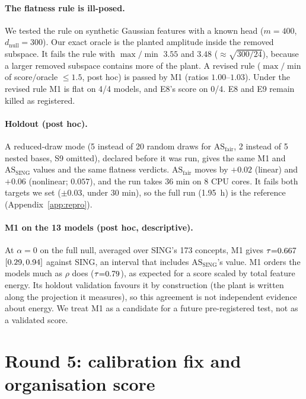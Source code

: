 \documentclass[10pt]{article}
\newcommand{\ASS}{\mathrm{AS}_{\mathrm{SING}}}
\newcommand{\ASF}{\mathrm{AS}_{\mathrm{fair}}}
\begin{document}
\paragraph{The flatness rule is ill-posed.}
We tested the rule on synthetic Gaussian features with a known head ($m{=}400$, $d_{\mathrm{null}}{=}300$). Our exact oracle is the planted amplitude inside the removed subspace. It fails the rule with $\max/\min$ $3.55$ and $3.48$ ($\approx\sqrt{300/24}$), because a larger removed subspace contains more of the plant.
A revised rule ($\max/\min$ of score$/$oracle $\le1.5$, post hoc) is passed by M1 (ratios $1.00$--$1.03$).
Under the revised rule M1 is flat on 4/4 models, and E8's score on 0/4.
E8 and E9 remain killed as registered.

\paragraph{Holdout (post hoc).}
\HoldoutParagraph
\HoldoutTable
A reduced-draw mode (5 instead of 20 random draws for $\ASF$, 2 instead of 5 nested bases, S9 omitted), declared before it was run, gives the same M1 and $\ASS$ values and the same flatness verdicts. $\ASF$ moves by $+0.02$ (linear) and $+0.06$ (nonlinear; $0.057$), and the run takes 36 min on 8 CPU cores. It fails both targets we set ($\pm0.03$, under 30 min), so the full run (1.95~h) is the reference (Appendix~\ref{app:repro}).

\paragraph{M1 on the 13 models (post hoc, descriptive).}
At $\alpha{=}0$ on the full null, averaged over SING's 173 concepts, M1 gives $\tau{=}0.667$ $[0.29,0.94]$ against SING, an interval that includes $\ASS$'s value.
M1 orders the models much as $\rho$ does ($\tau{=}0.79$), as expected for a score scaled by total feature energy.
Its holdout validation favours it by construction (the plant is written along the projection it measures), so this agreement is not independent evidence about energy.
We treat M1 as a candidate for a future pre-registered test, not as a validated score.

\section{Round 5: calibration fix and organisation score}
\label{app:r5}
\end{document}

